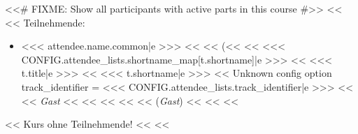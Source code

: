         <<# FIXME: Show all participants with active parts in this course #>>
        <<%
            <<%
                Teilnehmende:
                \begin{itemize}
                    <<%
                        \item
                            <<< attendee.name.common|e >>>
                            <<%
                            <<%
                                (<<%
                                    <<%
                                        <<< CONFIG.attendee_lists.shortname_map[t.shortname]|e >>>
                                    <<%
                                        <<< t.title|e >>>
                                    <<%
                                        <<< t.shortname|e >>>
                                    <<%
                                        Unknown config option track_identifier = <<< CONFIG.attendee_lists.track_identifier|e >>>
                                    <<%
                                    <<%
                                        \textit{Gast}
                                    <<%
                                    <<%
                                <<%
                            <<%
                                <<%
                                    (\textit{Gast})
                                <<%
                            <<%
                    <<%
                \end{itemize}
            <<%
                Kurs ohne Teilnehmende!
            <<%
        <<%

